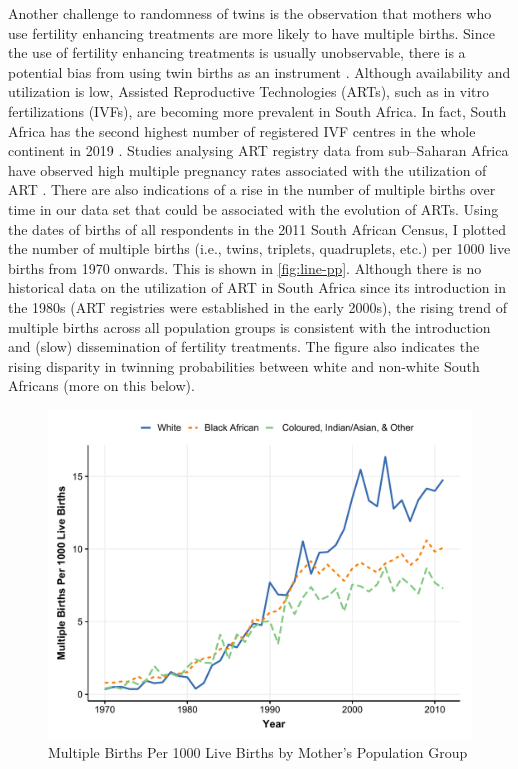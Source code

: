 Another challenge to randomness of twins is the observation that mothers who use fertility enhancing treatments are more likely to have multiple births. Since the use of fertility enhancing treatments is usually unobservable, there is a potential bias from using twin births as an instrument \parencite{braakmann_reconsidering_2016}. Although availability and utilization is low, Assisted Reproductive Technologies (ARTs), such as in vitro fertilizations (IVFs), are becoming more prevalent in South Africa. In fact, South Africa has the second highest number of registered IVF centres in the whole continent in 2019 \parencite{Ombelet2019}. Studies analysing ART registry data from sub–Saharan Africa have observed high multiple pregnancy rates associated with the utilization of ART \parencite{Botha2018,Dyer2019}. There are also indications of a rise in the number of multiple births over time in our data set that could be associated with the evolution of ARTs. Using the dates of births of all respondents in the 2011 South African Census, I plotted the number of multiple births (i.e., twins, triplets, quadruplets, etc.) per 1000 live births from 1970 onwards. This is shown in \autoref{fig:line-pp}. Although there is no historical data on the utilization of ART in South Africa since its introduction in the 1980s (ART registries were established in the early 2000s), the rising trend of multiple births across all population groups is consistent with the introduction and (slow) dissemination of fertility treatments. The figure also indicates the rising disparity in twinning probabilities between white and non-white South Africans (more on this below).

\begin{figure}[!th]
\centering
\caption{\label{fig:line-pp}Multiple Births Per 1000 Live Births by Mother's Population Group}
\includegraphics[width=\textwidth]{figures/line_pp.pdf}
\end{figure}

